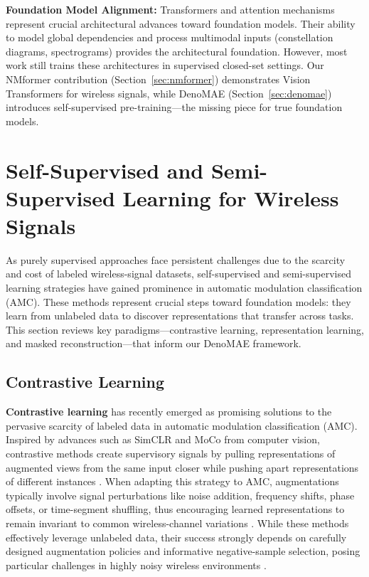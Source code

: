 \textbf{Foundation Model Alignment:} Transformers and attention mechanisms represent crucial architectural advances toward foundation models. Their ability to model global dependencies and process multimodal inputs (constellation diagrams, spectrograms) provides the architectural foundation. However, most work still trains these architectures in supervised closed-set settings. Our NMformer contribution (Section~\ref{sec:nmformer}) demonstrates Vision Transformers for wireless signals, while DenoMAE (Section~\ref{sec:denomae}) introduces self-supervised pre-training—the missing piece for true foundation models.

\section{Self-Supervised and Semi-Supervised Learning for Wireless Signals}

As purely supervised approaches face persistent challenges due to the scarcity and cost of labeled wireless-signal datasets, self-supervised and semi-supervised learning strategies have gained prominence in automatic modulation classification (AMC). These methods represent crucial steps toward foundation models: they learn from unlabeled data to discover representations that transfer across tasks. This section reviews key paradigms—contrastive learning, representation learning, and masked reconstruction—that inform our DenoMAE framework.

\subsection{Contrastive Learning}

\textbf{Contrastive learning} has recently emerged as promising solutions to the pervasive scarcity of labeled data in automatic modulation classification (AMC). Inspired by advances such as SimCLR \cite{chen2020simclr} and MoCo \cite{he2020moco} from computer vision, contrastive methods create supervisory signals by pulling representations of augmented views from the same input closer while pushing apart representations of different instances \cite{bu2020adversarial}. When adapting this strategy to AMC, augmentations typically involve signal perturbations like noise addition, frequency shifts, phase offsets, or time-segment shuffling, thus encouraging learned representations to remain invariant to common wireless-channel variations \cite{zheng2021spectrum}. While these methods effectively leverage unlabeled data, their success strongly depends on carefully designed augmentation policies and informative negative-sample selection, posing particular challenges in highly noisy wireless environments \cite{bu2020adversarial, zheng2021spectrum}.

